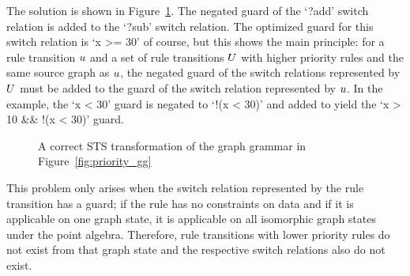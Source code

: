 The solution is shown in Figure~\ref{fig:priority_sts_right}. The negated guard of the `?add' switch relation is added to the `?sub' switch relation. The optimized guard for this switch relation is `x >= 30' of course, but this shows the main principle: for a rule transition $u$ and a set of rule transitions $U$ with higher priority rules and the same source graph as $u$, the negated guard of the switch relations represented by $U$ must be added to the guard of the switch relation represented by $u$. In the example, the `x < 30' guard is negated to `!(x < 30)' and added to yield the `x > 10 \&\& !(x < 30)' guard.

\begin{figure}[ht]
  \begin{center}
    
  \end{center}
  \caption{A correct STS transformation of the graph grammar in Figure~\ref{fig:priority_gg}}
  \label{fig:priority_sts_right}
\end{figure}

This problem only arises when the switch relation represented by the rule transition has a guard; if the rule has no constraints on data and if it is applicable on one graph state, it is applicable on all isomorphic graph states under the point algebra. Therefore, rule transitions with lower priority rules do not exist from that graph state and the respective switch relations also do not exist.
